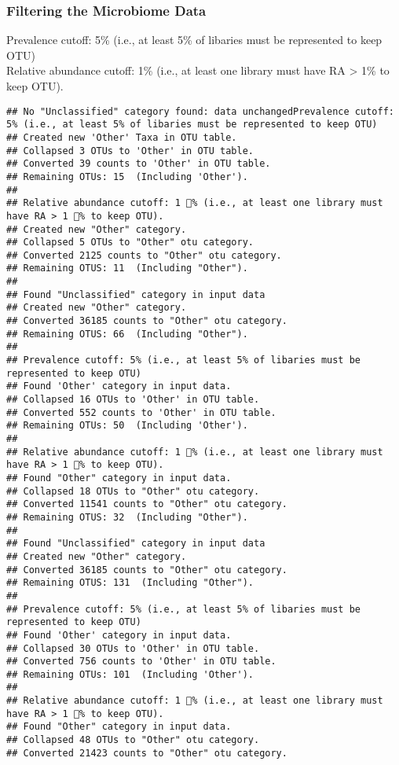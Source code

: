 \documentclass[]{article}
\begin{document}
\subsubsection{Filtering the Microbiome
Data}\label{filtering-the-microbiome-data}

Prevalence cutoff: 5\% (i.e., at least 5\% of libaries must be
represented to keep OTU)\\
Relative abundance cutoff: 1\% (i.e., at least one library must have RA
\textgreater{} 1\% to keep OTU).

\begin{verbatim}
## No "Unclassified" category found: data unchangedPrevalence cutoff: 5% (i.e., at least 5% of libaries must be represented to keep OTU)
## Created new 'Other' Taxa in OTU table.
## Collapsed 3 OTUs to 'Other' in OTU table.
## Converted 39 counts to 'Other' in OTU table.
## Remaining OTUs: 15  (Including 'Other').
## 
## Relative abundance cutoff: 1 % (i.e., at least one library must have RA > 1 % to keep OTU).
## Created new "Other" category.
## Collapsed 5 OTUs to "Other" otu category.
## Converted 2125 counts to "Other" otu category.
## Remaining OTUS: 11  (Including "Other").
## 
## Found "Unclassified" category in input data
## Created new "Other" category.
## Converted 36185 counts to "Other" otu category.
## Remaining OTUS: 66  (Including "Other").
## 
## Prevalence cutoff: 5% (i.e., at least 5% of libaries must be represented to keep OTU)
## Found 'Other' category in input data.
## Collapsed 16 OTUs to 'Other' in OTU table.
## Converted 552 counts to 'Other' in OTU table.
## Remaining OTUs: 50  (Including 'Other').
## 
## Relative abundance cutoff: 1 % (i.e., at least one library must have RA > 1 % to keep OTU).
## Found "Other" category in input data.
## Collapsed 18 OTUs to "Other" otu category.
## Converted 11541 counts to "Other" otu category.
## Remaining OTUS: 32  (Including "Other").
## 
## Found "Unclassified" category in input data
## Created new "Other" category.
## Converted 36185 counts to "Other" otu category.
## Remaining OTUS: 131  (Including "Other").
## 
## Prevalence cutoff: 5% (i.e., at least 5% of libaries must be represented to keep OTU)
## Found 'Other' category in input data.
## Collapsed 30 OTUs to 'Other' in OTU table.
## Converted 756 counts to 'Other' in OTU table.
## Remaining OTUs: 101  (Including 'Other').
## 
## Relative abundance cutoff: 1 % (i.e., at least one library must have RA > 1 % to keep OTU).
## Found "Other" category in input data.
## Collapsed 48 OTUs to "Other" otu category.
## Converted 21423 counts to "Other" otu category.

\end{verbatim}
\end{document}
